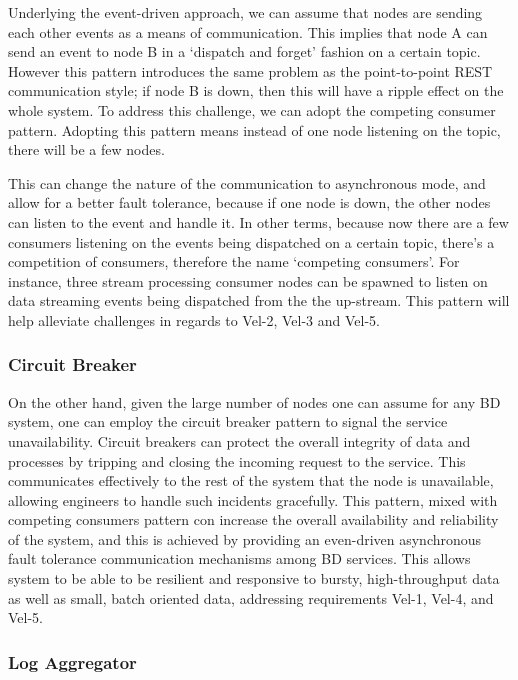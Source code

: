 \documentclass{bmcart}
\begin{document}
Underlying the event-driven approach, we can assume that nodes are sending each other events as a means of communication. This implies that node A can send an event to node B in a `dispatch and forget' fashion on a certain topic. However this pattern introduces the same problem as the point-to-point REST communication style; if node B is down, then this will have a ripple effect on the whole system. To address this challenge, we can adopt the competing consumer pattern. Adopting this pattern means instead of one node listening on the topic, there will be a few nodes. 

This can change the nature of the communication to asynchronous mode, and allow for a better fault tolerance, because if one node is down, the other nodes can listen to the event and handle it. In other terms, because now there are a few consumers listening on the events being dispatched on a certain topic, there's a competition of consumers, therefore the name `competing consumers'. For instance, three stream processing consumer nodes can be spawned to listen on data streaming events being dispatched from the the up-stream. This pattern will help alleviate challenges in regards to Vel-2, Vel-3 and Vel-5.

\subsubsection{Circuit Breaker}

On the other hand, given the large number of nodes one can assume for any BD system, one can employ the circuit breaker pattern to signal the service unavailability. Circuit breakers can protect the overall integrity of data and processes by tripping and closing the incoming request to the service. This communicates effectively to the rest of the system that the node is unavailable, allowing engineers to handle such incidents gracefully. This pattern, mixed with competing consumers pattern con increase the overall availability and reliability of the system, and this is achieved by providing an even-driven asynchronous fault tolerance communication mechanisms among BD services. This allows system to be able to be resilient and responsive to bursty, high-throughput data as well as small, batch oriented data, addressing requirements Vel-1, Vel-4, and Vel-5. 
    
\subsubsection{Log Aggregator}
\end{document}
